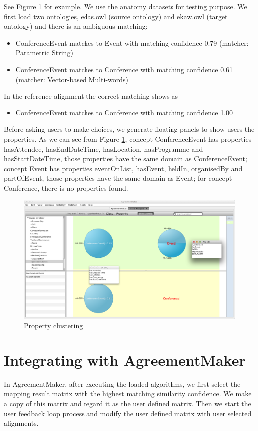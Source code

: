 See Figure \ref{fig:property_clustering} for example. We use the anatomy datasets for testing purpose. We first load two ontologies, edas.owl (source ontology) and ekaw.owl (target ontology) and there is an ambiguous matching: 
\begin{itemize}
\item ConferenceEvent matches to Event with matching confidence 0.79 (matcher: Parametric String)
\item ConferenceEvent matches to Conference with matching confidence 0.61 (matcher: Vector-based Multi-words)
\end{itemize}

In the reference alignment the correct matching shows as 
\begin{itemize}
\item ConferenceEvent matches to Conference with matching confidence 1.00 
\end{itemize}
Before asking users to make choices, we generate floating panels to show users the properties. As we can see from Figure \ref{fig:property_clustering}, concept ConferenceEvent has properties hasAttendee, hasEndDateTime, hasLocation, hasProgramme and hasStartDateTime, those properties have the same domain as ConferenceEvent; concept Event has properties eventOnList, hasEvent, heldIn, organisedBy and partOfEvent, those properties have the same domain as Event; for concept Conference, there is no properties found. 

\begin{figure}[htb]
	\centering
	\includegraphics[width=6.5in]{pics/property_cluster.png}
	\caption{Property clustering}
	\label{fig:property_clustering}
\end{figure}

\section{Integrating with AgreementMaker} %
\label{sub:integrating_with_agreementMaker}
In AgreementMaker, after executing the loaded algorithms, we first select the mapping result matrix with the highest matching similarity confidence. We make a copy of this matrix and regard it as the user defined matrix. Then we start the user feedback loop process and modify the user defined matrix with user selected alignments. 

